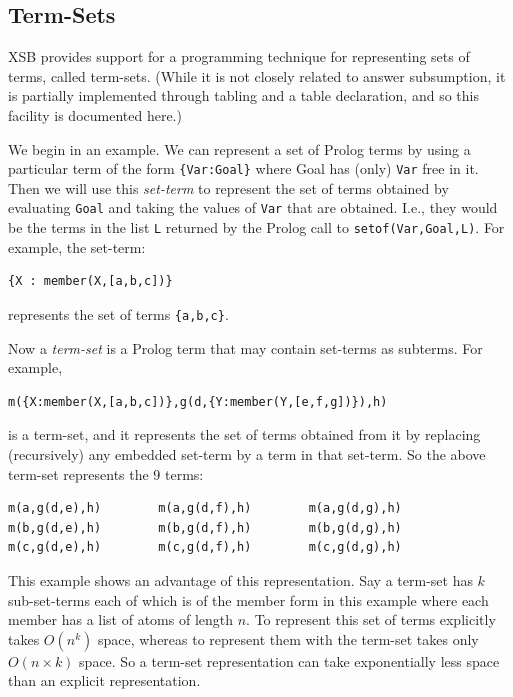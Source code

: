\subsection{Term-Sets}

XSB provides support for a programming technique for representing sets
of terms, called term-sets.  (While it is not closely related to
answer subsumption, it is partially implemented through tabling and a
table declaration, and so this facility is documented here.)

We begin in an example.  We can represent a set of Prolog terms by
using a particular term of the form \verb|{Var:Goal}| where Goal has
(only) \verb|Var| free in it.  Then we will use this \emph{set-term} to
represent the set of terms obtained by evaluating \verb|Goal| and
taking the values of \verb|Var| that are obtained.  I.e., they would
be the terms in the list \verb|L| returned by the Prolog call to
\verb|setof(Var,Goal,L)|. For example, the set-term:
\begin{verbatim}
{X : member(X,[a,b,c])}
\end{verbatim}
represents the set of terms \verb|{a,b,c}|.

Now a \emph{term-set} is a Prolog term that may contain set-terms as
subterms.  For example,
\begin{verbatim}
m({X:member(X,[a,b,c])},g(d,{Y:member(Y,[e,f,g])}),h)
\end{verbatim}
is a term-set, and it represents the set of terms obtained from it by
replacing (recursively) any embedded set-term by a term in that
set-term.  So the above term-set represents the 9 terms:
\begin{verbatim}
m(a,g(d,e),h)        m(a,g(d,f),h)        m(a,g(d,g),h)
m(b,g(d,e),h)        m(b,g(d,f),h)        m(b,g(d,g),h)
m(c,g(d,e),h)        m(c,g(d,f),h)        m(c,g(d,g),h)
\end{verbatim}
This example shows an advantage of this representation.  Say a
term-set has $k$ sub-set-terms each of which is of the member form in
this example where each member has a list of atoms of length $n$.  To
represent this set of terms explicitly takes $O(n^k)$ space, whereas
to represent them with the term-set takes only $O(n \times k)$ space.  So a
term-set representation can take exponentially less space than an
explicit representation.

